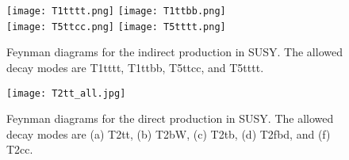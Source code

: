 \begin{figure}[!htb]
	\begin{center}
		\texttt{[image: T1tttt.png]}
		\texttt{[image: T1ttbb.png]} \\
		\texttt{[image: T5ttcc.png]}
		\texttt{[image: T5tttt.png]} \\
	\end{center}
	\caption[Gluino mediated stop production]{Feynman diagrams for the indirect \st{} production in SUSY. The allowed decay modes are T1tttt, T1ttbb, T5ttcc, and T5tttt.
	}
	\label{fig:stop-gluino-production}
\end{figure}

\begin{figure}[!htb]
	\begin{center}
		\texttt{[image: T2tt\_all.jpg]}
	\end{center}
	\caption[Direct stop production]{Feynman diagrams for the direct \st{} production in SUSY. The allowed decay modes are (a) T2tt, (b) T2bW, (c) T2tb, (d) T2fbd, and (f) T2cc. }
	\label{fig:stop-direct-production}
\end{figure}